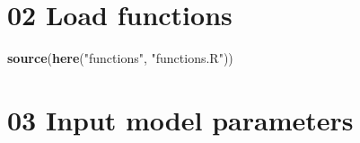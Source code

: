 \documentclass[
]{article}
\newenvironment{Shaded}{\begin{snugshade}}{\end{snugshade}}
\newcommand{\KeywordTok}[1]{\textcolor[rgb]{0.13,0.29,0.53}{\textbf{#1}}}
\newcommand{\NormalTok}[1]{#1}
\newcommand{\StringTok}[1]{\textcolor[rgb]{0.31,0.60,0.02}{#1}}
\begin{document}
\hypertarget{load-functions}{%
\section{02 Load functions}\label{load-functions}}

\begin{Shaded}
\begin{Highlighting}[]
\KeywordTok{source}\NormalTok{(}\KeywordTok{here}\NormalTok{(}\StringTok{"functions"}\NormalTok{, }\StringTok{"functions.R"}\NormalTok{))}
\end{Highlighting}
\end{Shaded}

\hypertarget{input-model-parameters}{%
\section{03 Input model parameters}\label{input-model-parameters}}
\end{document}
